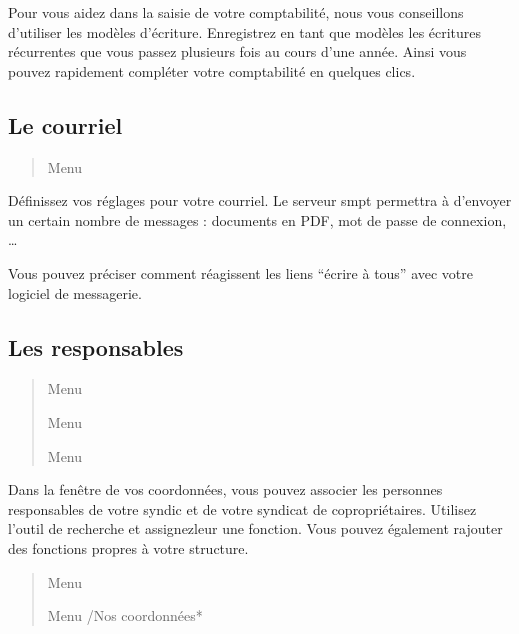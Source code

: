 \documentclass[a4paper,10pt,oneside,french]{sphinxmanual}
\begin{document}
Pour vous aidez dans la saisie de votre comptabilité, nous vous conseillons d’utiliser les modèles d’écriture. Enregistrez en tant que modèles les écritures récurrentes que vous passez plusieurs fois au cours d’une année. Ainsi vous pouvez rapidement compléter votre comptabilité en quelques clics.


\subsection{Le courriel}
\label{\detokenize{syndic/first_step:le-courriel}}\begin{quote}

Menu 
\end{quote}

Définissez vos réglages pour votre courriel.
Le serveur smpt permettra à  d’envoyer un certain nombre de messages : documents en PDF, mot de passe de connexion, …

Vous pouvez préciser comment réagissent les liens “écrire à tous” avec votre logiciel de messagerie.


\subsection{Les responsables}
\label{\detokenize{syndic/first_step:les-responsables}}\begin{quote}

Menu 

Menu 

Menu 
\end{quote}

Dans la fenêtre de vos coordonnées, vous pouvez associer les personnes responsables de votre syndic et de votre syndicat de copropriétaires.
Utilisez l’outil de recherche et assignez\sphinxhyphen{}leur une fonction.
Vous pouvez également rajouter des fonctions propres à votre structure.
\begin{quote}

Menu 

Menu /Nos coordonnées*
\end{quote}
\end{document}
